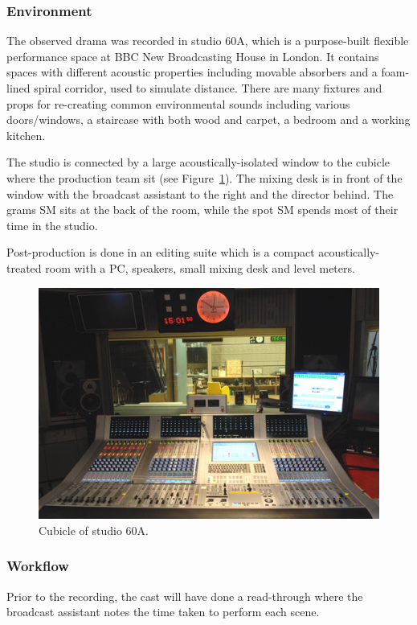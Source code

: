 \subsubsection{Environment}
The observed drama was recorded in studio 60A, which is a purpose-built flexible performance space at BBC New
Broadcasting House in London. It contains spaces with different acoustic properties including movable absorbers and a
foam-lined spiral corridor, used to simulate distance. There are many fixtures and props for re-creating common
environmental sounds including various doors/windows, a staircase with both wood and carpet, a bedroom and a working
kitchen.

The studio is connected by a large acoustically-isolated window to the cubicle where the production team sit (see
Figure~\ref{fig:drama-studio}). The mixing desk is in front of the window with the broadcast assistant to the right and
the director behind. The grams SM sits at the back of the room, while the spot SM spends most of their time in the
studio.

Post-production is done in an editing suite which is a compact acoustically-treated room with a PC, speakers, small
mixing desk and level meters.

\begin{figure}[ht]
  \centering
  \includegraphics[width=\columnwidth]{figs/60a.jpg}
  \caption{Cubicle of studio 60A.}
  \label{fig:drama-studio}
\end{figure}

\subsubsection{Workflow}
Prior to the recording, the cast will have done a read-through where the broadcast assistant notes the time taken to
perform each scene.

